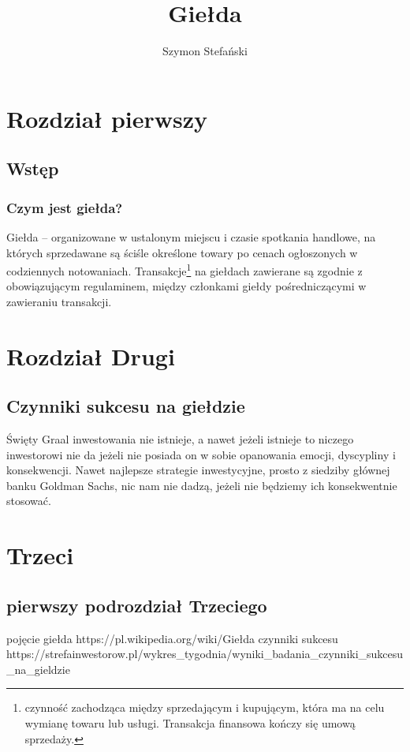 \documentclass{report}
\title{Giełda}
\author{Szymon Stefański}
\begin{document}
\maketitle
\tableofcontents
\newpage
\chapter{Rozdział pierwszy}
\section{Wstęp}
\subsection{Czym jest giełda?}
Giełda \cite{pa} – organizowane w ustalonym miejscu i czasie spotkania handlowe, na których sprzedawane są ściśle określone towary po cenach ogłoszonych w codziennych notowaniach. Transakcje\footnote{ czynność zachodząca między sprzedającym i kupującym, która ma na celu wymianę towaru lub usługi. Transakcja finansowa kończy się umową sprzedaży. } na giełdach zawierane są zgodnie z obowiązującym regulaminem, między członkami giełdy pośredniczącymi w zawieraniu transakcji. 
\newpage
\chapter{Rozdział Drugi}
\section{Czynniki sukcesu na giełdzie}
Święty Graal inwestowania nie istnieje, a nawet jeżeli istnieje to niczego inwestorowi nie da jeżeli nie posiada on w sobie opanowania emocji, dyscypliny i konsekwencji. Nawet najlepsze strategie inwestycyjne, prosto z siedziby głównej banku Goldman Sachs, nic nam nie dadzą, jeżeli nie będziemy ich konsekwentnie stosować.\cite{fib}
\newpage
\chapter{Trzeci}
\section{pierwszy podrozdział Trzeciego}
\begin{thebibliography}{99}
pojęcie giełda
https://pl.wikipedia.org/wiki/Giełda
czynniki sukcesu
https://strefainwestorow.pl/wykres\_tygodnia/wyniki\_badania\_czynniki\_sukcesu\_na\_gieldzie
\end{thebibliography}
\end{document}
